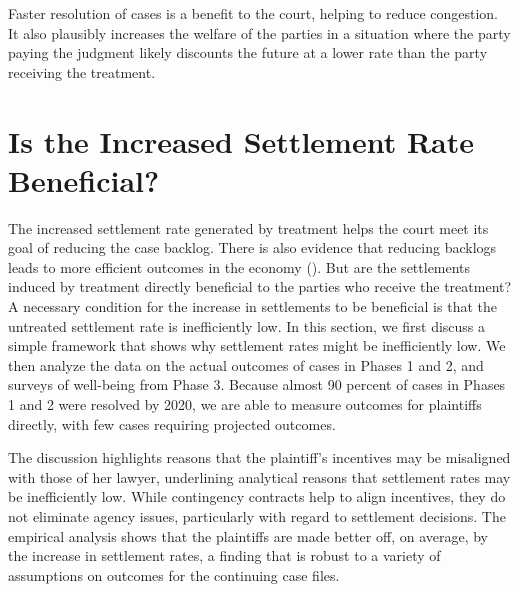 \documentclass[11pt, a4paper]{article}
\begin{document}

Faster resolution of cases is a benefit to the court, helping to reduce congestion. It also plausibly increases the welfare of the parties in a situation where the party paying the judgment likely discounts the future at a lower rate than the party receiving the treatment. 

\section{Is the Increased Settlement Rate Beneficial?} 
\label{ModelSection}

The increased settlement rate generated by treatment helps the court meet its goal of reducing the case backlog. There is also evidence that reducing backlogs leads to more efficient outcomes in the economy (\cite{PonticelliAlencar_Bankrupcy}). But are the settlements induced by treatment directly beneficial to the parties who receive the treatment? A necessary condition for the increase in settlements to be beneficial is that the untreated settlement rate is inefficiently low. In this section, we first discuss a simple framework that shows why settlement rates might be inefficiently low. We then analyze the data on the actual outcomes of cases in Phases 1 and 2, and surveys of well-being from Phase 3. Because almost 90 percent of cases in Phases 1 and 2 were resolved by 2020, we are able to measure outcomes for plaintiffs directly, with few cases requiring projected outcomes.

The discussion highlights reasons that the plaintiff's incentives may be misaligned with those of her lawyer, underlining analytical reasons that settlement rates may be inefficiently low. While contingency contracts help to align incentives, they do not eliminate agency issues, particularly with regard to settlement decisions. The empirical analysis shows that the plaintiffs are made better off, on average, by the increase in settlement rates, a finding that is robust to a variety of assumptions on outcomes for the continuing case files. 
\end{document}
